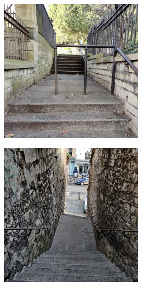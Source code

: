 \begin{figure}[p]
    \begin{subfigure}[b]{\textwidth}
        \centering
        \begin{subfigure}[b]{0.32\textwidth}
            \centering
            \includegraphics[width=\textwidth]{content/3-Methods/enviroments/stair_1_modified.jpg}
        \end{subfigure}
        \hfill
        \begin{subfigure}[b]{0.32\textwidth}
            \centering
            \includegraphics[width=\textwidth]{content/3-Methods/enviroments/stair_2_modified.jpg}

\end{subfigure}
\end{subfigure}
\end{figure}

